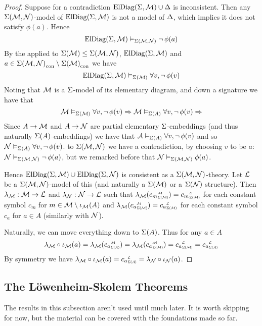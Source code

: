 \begin{proof}
    Suppose for a contradiction $\mathrm{ElDiag}(\Sigma,\mathcal{M}) \cup \Delta$ is inconsistent.
    Then any $\Sigma(\mathcal{M},\mathcal{N})$-model of 
    $\mathrm{ElDiag}(\Sigma,\mathcal{M})$ is not a model of $\Delta$,
    which implies it does not satisfy $\phi(a)$.
    Hence
    \[\mathrm{ElDiag}(\Sigma,\mathcal{M}) \vDash_{\Sigma(\mathcal{M},\mathcal{N})} \neg\, \phi(a)\]
    By the  applied to 
    $\Sigma(\mathcal{M}) \leq \Sigma(\mathcal{M},\mathcal{N})$, $\mathrm{ElDiag}(\Sigma,\mathcal{M})$ and 
    $a \in {\Sigma(\mathcal{M},\mathcal{N})}_\mathrm{con} \setminus {\Sigma(\mathcal{M})}_\mathrm{con}$ we have
    \[\mathrm{ElDiag}(\Sigma,\mathcal{M}) \vDash_{\Sigma(\mathcal{M})} \forall v, \neg\, \phi(v)\]
    Noting that $\mathcal{M}$ is a $\Sigma$-model of its elementary diagram, 
    and  down a signature we have that 
    \[
        \mathcal{M} \vDash_{\Sigma(\mathcal{M})} \forall v, \neg\, \phi(v) \Rightarrow 
        \mathcal{M} \vDash_{\Sigma(A)} \forall v, \neg\, \phi(v) \Rightarrow 
    \]
    Since $A \to \mathcal{M}$ and $A \to \mathcal{N}$ are partial elementary $\Sigma$-embeddings
    (and thus naturally $\Sigma(A)$-embeddings) 
    we have that 
    $\mathcal{A} \vDash_{\Sigma(A)} \forall v, \neg\, \phi(v)$ and so 
    $\mathcal{N} \vDash_{\Sigma(A)} \forall v, \neg\, \phi(v)$.
    to $\Sigma(\mathcal{M},\mathcal{N})$ we have a contradiction, by choosing 
    $v$ to be $a$:
    $\mathcal{N} \vDash_{\Sigma(\mathcal{M},\mathcal{N})} \neg\, \phi(a)$, 
    but we remarked before that $\mathcal{N} \vDash_{\Sigma(\mathcal{M},\mathcal{N})} \phi(a)$.

    Hence $\mathrm{ElDiag}(\Sigma,\mathcal{M}) \cup \mathrm{ElDiag}(\Sigma,\mathcal{N})$
    is consistent as a $\Sigma(\mathcal{M},\mathcal{N})$-theory. 
    Let $\mathcal{L}$ be a $\Sigma(\mathcal{M},\mathcal{N})$-model of this
    (and naturally a $\Sigma(\mathcal{M})$ or a $\Sigma(\mathcal{N})$ structure).
    Then 
    $\lambda_{\mathcal{M}} : \mathcal{M} \to \mathcal{L}$ and $\lambda_{\mathcal{N}} : \mathcal{N} \to \mathcal{L}$ such that 
    $\la_\MM(\subintp{\Si(\MM)}{\MM}{c_m}) = \subintp{\Si(\MM)}{\LL}{c_m}$ 
    for each constant symbol $c_m$ for $m \in \mathcal{M} \setminus \iota_{\mathcal{M}}(A)$ 
    and 
    $\la_\MM(\subintp{\Si(\MM)}{\MM}{c_a}) = \subintp{\Si(\MM)}{\LL}{c_a}$ 
    for each constant symbol $c_a$ for $a \in A$
    (similarly with $\mathcal{N}$).

    Naturally, we can move everything down to $\Sigma(A)$.
    Thus for any $a \in A$
    \[
        \la_\MM \circ \io_\MM(a) = \la_\MM (\subintp{\Si(A)}{\MM}{c_a})
        = \la_\MM (\subintp{\Si(\MM)}{\MM}{c_a}) = 
        \subintp{\Si(\MM)}{\LL}{c_a} = \subintp{\Si(A)}{\LL}{c_a}
    \]
    By symmetry we have 
    $\la_\MM \circ \io_\MM(a) = \subintp{\Si(A)}{\LL}{c_a} =
    \la_\NN \circ \io_\NN(a)$.
\end{proof}

\subsection{The L\"{o}wenheim-Skolem Theorems}
The results in this subsection aren't used until much later.%
It is worth skipping for now, 
but the material can be covered with the foundations made so far.

